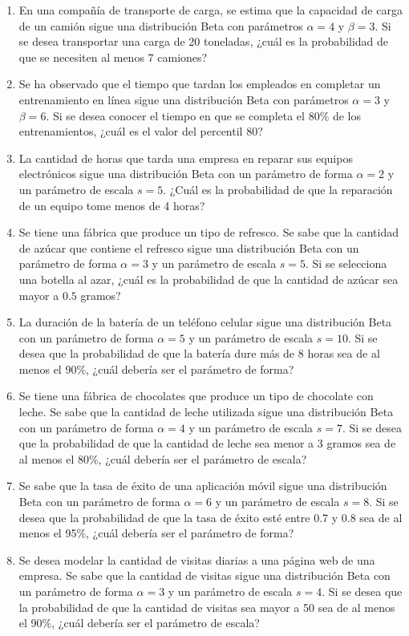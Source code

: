 \begin{Ejer}
\begin{enumerate}
\item En una compañía de transporte de carga, se estima que la capacidad de carga de un camión sigue una distribución Beta con parámetros $\alpha=4$ y $\beta=3$. Si se desea transportar una carga de 20 toneladas, ¿cuál es la probabilidad de que se necesiten al menos 7 camiones?

\item Se ha observado que el tiempo que tardan los empleados en completar un entrenamiento en línea sigue una distribución Beta con parámetros $\alpha=3$ y $\beta=6$. Si se desea conocer el tiempo en que se completa el 80\% de los entrenamientos, ¿cuál es el valor del percentil 80?

\item La cantidad de horas que tarda una empresa en reparar sus equipos electrónicos sigue una distribución Beta con un parámetro de forma $\alpha=2$ y un parámetro de escala $s=5$. ¿Cuál es la probabilidad de que la reparación de un equipo tome menos de 4 horas?

\item Se tiene una fábrica que produce un tipo de refresco. Se sabe que la cantidad de azúcar que contiene el refresco sigue una distribución Beta con un parámetro de forma $\alpha=3$ y un parámetro de escala $s=5$. Si se selecciona una botella al azar, ¿cuál es la probabilidad de que la cantidad de azúcar sea mayor a $0.5$ gramos?

\item La duración de la batería de un teléfono celular sigue una distribución Beta con un parámetro de forma $\alpha=5$ y un parámetro de escala $s=10$. Si se desea que la probabilidad de que la batería dure más de 8 horas sea de al menos el 90\%, ¿cuál debería ser el parámetro de forma?

\item Se tiene una fábrica de chocolates que produce un tipo de chocolate con leche. Se sabe que la cantidad de leche utilizada sigue una distribución Beta con un parámetro de forma $\alpha=4$ y un parámetro de escala $s=7$. Si se desea que la probabilidad de que la cantidad de leche sea menor a 3 gramos sea de al menos el 80\%, ¿cuál debería ser el parámetro de escala?

\item Se sabe que la tasa de éxito de una aplicación móvil sigue una distribución Beta con un parámetro de forma $\alpha=6$ y un parámetro de escala $s=8$. Si se desea que la probabilidad de que la tasa de éxito esté entre 0.7 y 0.8 sea de al menos el 95\%, ¿cuál debería ser el parámetro de forma?

\item Se desea modelar la cantidad de visitas diarias a una página web de una empresa. Se sabe que la cantidad de visitas sigue una distribución Beta con un parámetro de forma $\alpha=3$ y un parámetro de escala $s=4$. Si se desea que la probabilidad de que la cantidad de visitas sea mayor a 50 sea de al menos el 90\%, ¿cuál debería ser el parámetro de escala?

\end{enumerate}
\end{Ejer} 


